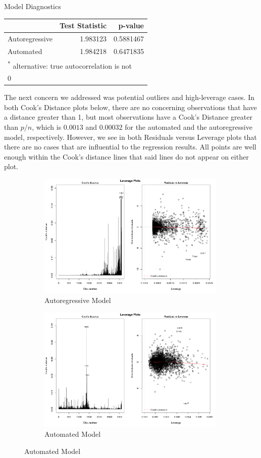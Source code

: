 \documentclass[]{article}
\begin{document}
\begin{section}{Model Diagnostics}
\begin{table}[H]
\centering
\begin{tabular}{l|r|r}
\hline
  & Test Statistic & p-value\\
\hline
Autoregressive & 1.983123 & 0.5881467\\
\hline
Automated & 1.984218 & 0.6471835\\
\hline
\multicolumn{3}{l}{\textsuperscript{*} alternative: true autocorrelation is not}\\
\multicolumn{3}{l}{0}\\
\end{tabular}
\end{table}

The next concern we addressed was potential outliers and high-leverage cases. In both Cook's Distance plots below, there are no concerning observations that have a distance greater than 1, but most observations have a Cook's Distance greater than $p/n$, which is $0.0013$ and $0.00032$ for the automated and the autoregressive model, respectively. However, we see in both Residuals versus Leverage plots that there are no cases that are influential to the regression results. All points are well enough within the Cook's distance lines that said lines do not appear on either plot.

\begin{figure}[h]
\begin{subfigure}{.5\textwidth}
  \includegraphics[width=90mm]{diagnostics/arm_leverage_plots.png}
  \caption{Autoregressive Model}
\end{subfigure}%
\begin{subfigure}{.5\textwidth}
  \includegraphics[width=90mm]{diagnostics/fm_leverage_plots.png}
  \caption{Automated Model}
\end{subfigure}
\end{figure}


\end{section}
\end{document}
